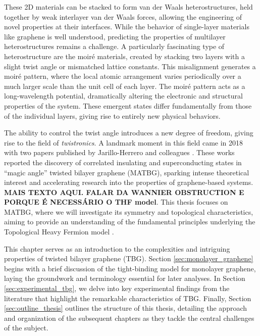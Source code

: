 These 2D materials can be stacked to form van der Waals heterostructures, held together by weak interlayer van der Waals forces, allowing the engineering of novel properties at their interfaces. While the behavior of single-layer materials like graphene is well understood, predicting the properties of multilayer heterostructures remains a challenge. A particularly fascinating type of heterostructure are the moiré materials, created by stacking two layers with a slight twist angle or mismatched lattice constants. This misalignment generates a moiré pattern, where the local atomic arrangement varies periodically over a much larger scale than the unit cell of each layer. The moiré pattern acts as a long-wavelength potential, dramatically altering the electronic and structural properties of the system. These emergent states differ fundamentally from those of the individual layers, giving rise to entirely new physical behaviors.

The ability to control the twist angle introduces a new degree of freedom, giving rise to the field of \textit{twistronics}. A landmark moment in this field came in 2018 with two papers published by Jarillo-Herrero and colleagues \cite{cao2018, cao2018_correlated}. These works reported the discovery of correlated insulating and superconducting states in ``magic angle'' twisted bilayer graphene (MATBG), sparking intense theoretical interest and accelerating research into the properties of graphene-based systems. \textbf{MAIS TEXTO AQUI. FALAR DA WANNIER OBSTRUCTION E PORQUE É NECESSÁRIO O THF model}. This thesis focuses on MATBG, where we will investigate its symmetry and topological characteristics, aiming to provide an understanding of the fundamental principles underlying the Topological Heavy Fermion model \cite{topoheavyfermion2022}.

This chapter serves as an introduction to the complexities and intriguing properties of twisted bilayer graphene (TBG). Section \ref{sec:monolayer_graphene} begins with a brief discussion of the tight-binding model for monolayer graphene, laying the groundwork and terminology essential for later analyses. In Section \ref{sec:experimental_tbg}, we delve into key experimental findings from the literature that highlight the remarkable characteristics of TBG. Finally, Section \ref{sec:outline_thesis} outlines the structure of this thesis, detailing the approach and organization of the subsequent chapters as they tackle the central challenges of the subject.

